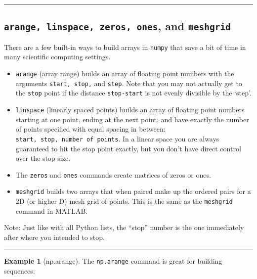 \documentclass[
]{book}
\providecommand{\tightlist}{%
  \setlength{\itemsep}{0pt}\setlength{\parskip}{0pt}}
\theoremstyle{definition}
\theoremstyle{definition}
\newtheorem{example}{Example}[chapter]
\theoremstyle{definition}
\theoremstyle{remark}
\begin{document}
\begin{center}\rule{0.5\linewidth}{0.5pt}\end{center}

\hypertarget{arange-linspace-zeros-ones-and-meshgrid}{%
\subsection{\texorpdfstring{\texttt{arange,\ linspace,\ zeros,\ ones}, and \texttt{meshgrid}}{arange, linspace, zeros, ones, and meshgrid}}\label{arange-linspace-zeros-ones-and-meshgrid}}

There are a few built-in ways to build arrays in \texttt{numpy} that save a bit
of time in many scientific computing settings.

\begin{itemize}
\tightlist
\item
  \texttt{arange} (array range) builds an array of floating point numbers with the arguments \texttt{start,\ stop,} and \texttt{step}. Note that you may not actually get to the \texttt{stop} point if the distance \texttt{stop-start} is not evenly divisible by the `step'.
\item
  \texttt{linspace} (linearly spaced points) builds an array of floating point numbers starting at one point, ending at the next point, and have exactly the number of points specified with equal spacing in between: \texttt{start,\ stop,\ number\ of\ points}. In a linear space you are always guaranteed to hit the stop point exactly, but you don't have direct control over the stop size.
\item
  The \texttt{zeros} and \texttt{ones} commands create matrices of zeros or ones.
\item
  \texttt{meshgrid} builds two arrays that when paired make up the ordered pairs for a 2D (or higher D) mesh grid of points. This is the same as the \texttt{meshgrid} command in MATLAB.
\end{itemize}

Note: Just like with all Python lists, the ``stop'' number is the one immediately after where you intended to stop.

\begin{center}\rule{0.5\linewidth}{0.5pt}\end{center}

\begin{example}[np.arange]
\protect\hypertarget{exm:unnamed-chunk-738}{}{\label{exm:unnamed-chunk-738} {} }The \texttt{np.arange} command is great for building sequences.
\end{example}
\end{document}

